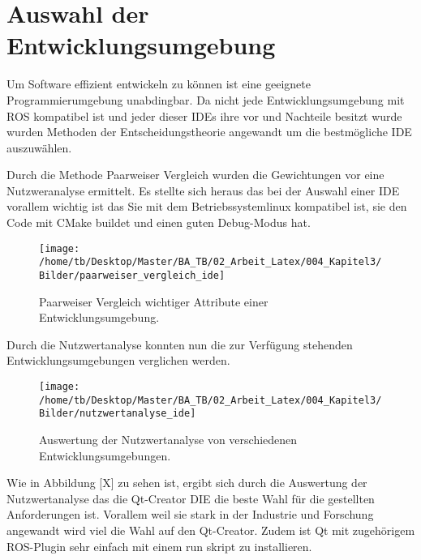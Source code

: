 %

\chapter{Auswahl der Entwicklungsumgebung}
\label{cha:Auswahl der Entwicklungsumgebung} 

Um Software effizient entwickeln zu k{\"o}nnen ist eine geeignete Programmierumgebung unabdingbar. 
Da nicht jede Entwicklungsumgebung mit ROS kompatibel ist und jeder dieser IDEs ihre vor und Nachteile besitzt wurde wurden Methoden der Entscheidungstheorie angewandt um die bestm{\"o}gliche IDE auszuw{\"a}hlen.

Durch die Methode Paarweiser Vergleich wurden die Gewichtungen vor eine Nutzweranalyse ermittelt. Es stellte sich heraus das bei der Auswahl einer IDE vorallem wichtig ist das Sie mit dem Betriebssystemlinux kompatibel ist, sie den Code mit CMake buildet und einen guten Debug-Modus hat.






\begin{figure}[H]
\begin{center}
  \texttt{[image: /home/tb/Desktop/Master/BA\_TB/02\_Arbeit\_Latex/004\_Kapitel3/Bilder/paarweiser\_vergleich\_ide]}%
  \caption[PaarweiserVergleichIDE]%
           {\label{fig:PaarweiserVergleichIDE}%
           Paarweiser Vergleich wichtiger Attribute einer Entwicklungsumgebung.}
\end{center}
\end{figure}

Durch die Nutzwertanalyse konnten nun die zur Verfügung stehenden Entwicklungsumgebungen verglichen werden. 

\begin{figure}[H]
\begin{center}
  \texttt{[image: /home/tb/Desktop/Master/BA\_TB/02\_Arbeit\_Latex/004\_Kapitel3/Bilder/nutzwertanalyse\_ide]}%
  \caption[NutzwertAnalyseIDE]%
           {\label{fig:NutzwertAnalyseIDE}%
           Auswertung der Nutzwertanalyse von verschiedenen Entwicklungsumgebungen.}
\end{center}
\end{figure}


Wie in Abbildung [X] zu sehen ist, ergibt sich durch die Auswertung der Nutzwertanalyse das die Qt-Creator DIE die beste Wahl f{\"u}r die gestellten Anforderungen ist. Vorallem weil sie stark in der Industrie und Forschung angewandt wird viel die Wahl auf den Qt-Creator. Zudem ist Qt mit zugeh{\"o}rigem ROS-Plugin sehr einfach mit einem run skript zu installieren.






